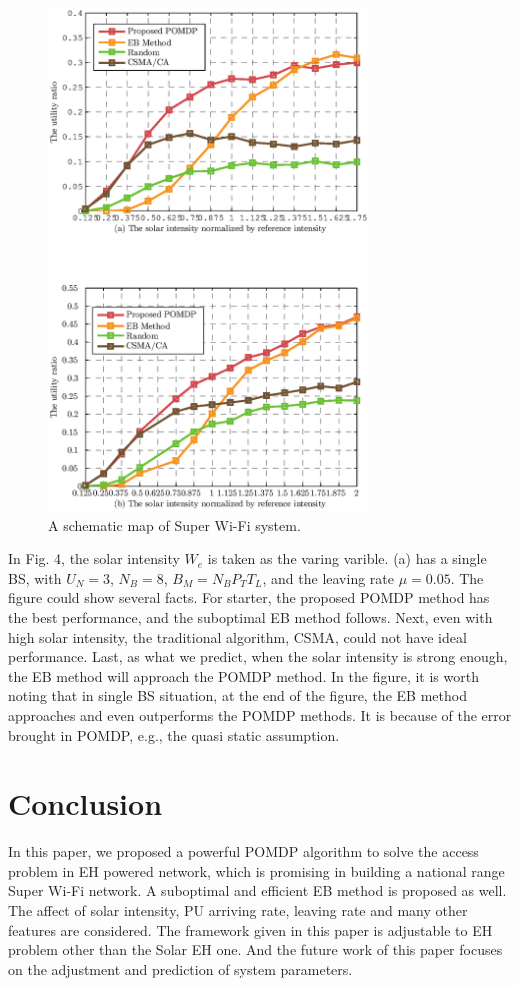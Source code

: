 \documentclass[conference]{IEEEtran}
\begin{document}
\begin{figure}[t]
\centering
\includegraphics[width=8.5cm]{2_fig2.eps}
\caption{A schematic map of Super Wi-Fi system.}
\end{figure}
\indent In Fig. 4, the solar intensity \(W_e\) is taken as the varing varible. 
(a) has a single BS, with \(U_N = 3\), \(N_B = 8\), \(B_M = N_BP_TT_L\),
and the leaving rate \(\mu = 0.05\).
The figure could show several facts. 
For starter, the proposed POMDP method has the best performance, and the suboptimal EB method follows.
Next, even with high solar intensity, the traditional algorithm, CSMA, could not have ideal performance.
Last, as what we predict, when the solar intensity is strong enough, the EB method will approach the POMDP method.
In the figure, it is worth noting that in single BS situation, at the end of the figure, 
the EB method approaches and even outperforms the POMDP methods.
It is because of the error brought in POMDP, e.g., the quasi static assumption.
\section{Conclusion}
In this paper, we proposed a powerful POMDP algorithm to solve the access problem in EH powered network, 
which is promising in building a national range Super Wi-Fi network.
A suboptimal and efficient EB method is proposed as well.
The affect of solar intensity, PU arriving rate, leaving rate and many other features are considered.
The framework given in this paper is adjustable to EH problem other than the Solar EH one. 
And the future work of this paper focuses on the adjustment and prediction of system parameters.


\end{document}
